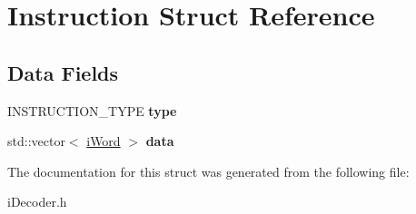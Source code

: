 \hypertarget{structInstruction}{
\section{Instruction Struct Reference}
\label{structInstruction}
}
\subsection*{Data Fields}
\begin{DoxyCompactItemize}
\item 
\hypertarget{structInstruction_afc9f26527635d9d851759eab142e5ec7}{
INSTRUCTION\_\-TYPE {\bfseries type}}
\label{structInstruction_afc9f26527635d9d851759eab142e5ec7}

\item 
\hypertarget{structInstruction_a0192b4cb3814295c601f5b988b6944eb}{
std::vector$<$ \hyperlink{classiWord}{iWord} $>$ {\bfseries data}}
\label{structInstruction_a0192b4cb3814295c601f5b988b6944eb}

\end{DoxyCompactItemize}


The documentation for this struct was generated from the following file:\begin{DoxyCompactItemize}
\item 
iDecoder.h\end{DoxyCompactItemize}
